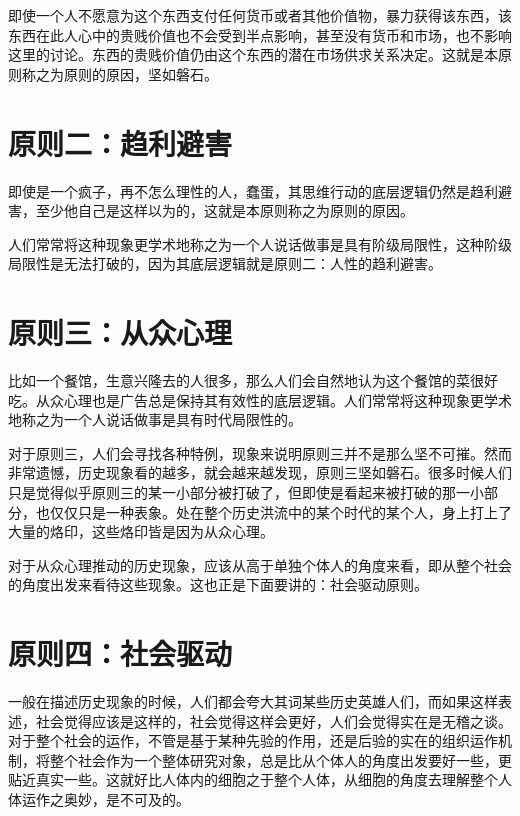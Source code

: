 \documentclass[12pt,oneside]{book}
\begin{document}
即使一个人不愿意为这个东西支付任何货币或者其他价值物，暴力获得该东西，该东西在此人心中的贵贱价值也不会受到半点影响，甚至没有货币和市场，也不影响这里的讨论。东西的贵贱价值仍由这个东西的潜在市场供求关系决定。这就是本原则称之为原则的原因，坚如磐石。


\section{原则二：趋利避害}

即使是一个疯子，再不怎么理性的人，蠢蛋，其思维行动的底层逻辑仍然是趋利避害，至少他自己是这样以为的，这就是本原则称之为原则的原因。

人们常常将这种现象更学术地称之为一个人说话做事是具有阶级局限性，这种阶级局限性是无法打破的，因为其底层逻辑就是原则二：人性的趋利避害。


\section{原则三：从众心理}

比如一个餐馆，生意兴隆去的人很多，那么人们会自然地认为这个餐馆的菜很好吃。从众心理也是广告总是保持其有效性的底层逻辑。人们常常将这种现象更学术地称之为一个人说话做事是具有时代局限性的。

对于原则三，人们会寻找各种特例，现象来说明原则三并不是那么坚不可摧。然而非常遗憾，历史现象看的越多，就会越来越发现，原则三坚如磐石。很多时候人们只是觉得似乎原则三的某一小部分被打破了，但即使是看起来被打破的那一小部分，也仅仅只是一种表象。处在整个历史洪流中的某个时代的某个人，身上打上了大量的烙印，这些烙印皆是因为从众心理。

对于从众心理推动的历史现象，应该从高于单独个体人的角度来看，即从整个社会的角度出发来看待这些现象。这也正是下面要讲的：社会驱动原则。



\section{原则四：社会驱动}

一般在描述历史现象的时候，人们都会夸大其词某些历史英雄人们，而如果这样表述，社会觉得应该是这样的，社会觉得这样会更好，人们会觉得实在是无稽之谈。对于整个社会的运作，不管是基于某种先验的作用，还是后验的实在的组织运作机制，将整个社会作为一个整体研究对象，总是比从个体人的角度出发要好一些，更贴近真实一些。这就好比人体内的细胞之于整个人体，从细胞的角度去理解整个人体运作之奥妙，是不可及的。
\end{document}
